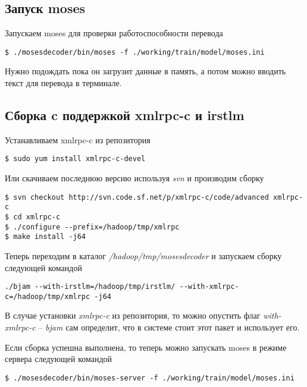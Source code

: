 \subsection{Запуск moses}
Запускаем moses для проверки работоспособности перевода
\begin{lstlisting}
$ ./mosesdecoder/bin/moses -f ./working/train/model/moses.ini
\end{lstlisting}
Нужно подождать пока он загрузит данные в память, а потом можно вводить текст для перевода в терминале.

\subsection{Сборка c поддержкой xmlrpc-c и irstlm}
Устанавливаем xmlrpc-c из репозитория
\begin{lstlisting}
$ sudo yum install xmlrpc-c-devel
\end{lstlisting}

Или скачиваем последнюю версию используя \emph{svn} и производим сборку
\begin{lstlisting}
$ svn checkout http://svn.code.sf.net/p/xmlrpc-c/code/advanced xmlrpc-c
$ cd xmlrpc-c
$ ./configure --prefix=/hadoop/tmp/xmlrpc
$ make install -j64
\end{lstlisting}

Теперь переходим в каталог \emph{/hadoop/tmp/mosesdecoder} и запускаем сборку следующей командой
\begin{lstlisting}
./bjam --with-irstlm=/hadoop/tmp/irstlm/ --with-xmlrpc-c=/hadoop/tmp/xmlrpc -j64
\end{lstlisting}
В случае установки \emph{xmlrpc-c} из репозитория, то можно опустить флаг \emph{with-xmlrpc-c} -- 
\emph{bjam} сам определит, что в системе стоит этот пакет и использует его.

Если сборка успешна выполнена, то теперь можно запускать moses в режиме сервера следующей командой
\begin{lstlisting}
$ ./mosesdecoder/bin/moses-server -f ./working/train/model/moses.ini
\end{lstlisting}